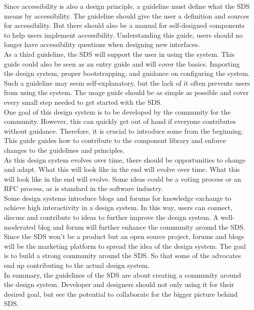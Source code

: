 Since accessibility is also a design principle, a guideline must define what the \ac{SDS} means by accessibility. The guideline should give the user a definition and sources for accessibility. But there should also be a manual for self-designed components to help users implement accessibility. Understanding this guide, users should no longer have accessibility questions when designing new interfaces. \\

As a third guideline, the \ac{SDS} will support the user in using the system. This guide could also be seen as an entry guide and will cover the basics. Importing the design system, proper bootstrapping, and guidance on configuring the system. Such a guideline may seem self-explanatory, but the lack of it often prevents users from using the system. The usage guide should be as simple as possible and cover every small step needed to get started with the \ac{SDS}. \\

One goal of this design system is to be developed by the community for the community. However, this can quickly get out of hand if everyone contributes without guidance. Therefore, it is crucial to introduce some from the beginning. This guide guides how to contribute to the component library and enforce changes to the guidelines and principles. \\
As this design system evolves over time, there should be opportunities to change and adapt. What this will look like in the end will evolve over time. What this will look like in the end will evolve. Some ideas could be a voting process or an RFC process, as is standard in the software industry. \\


Some design systems introduce blogs and forums for knowledge exchange to achieve high interactivity in a design system. In this way, users can connect, discuss and contribute to ideas to further improve the design system. A well-moderated blog and forum will further enhance the community around the \ac{SDS}. \\
Since the \ac{SDS} won't be a product but an open source project, forums and blogs will be the marketing platform to spread the idea of the design system. The goal is to build a strong community around the \ac{SDS}. So that some of the advocates end up contributing to the actual design system. \\

In summary, the guidelines of the \acl{SDS} are about creating a community around the design system. Developer and designers should not only using it for their desired goal, but see the potential to collaborate for the bigger picture behind \ac{SDS}.


